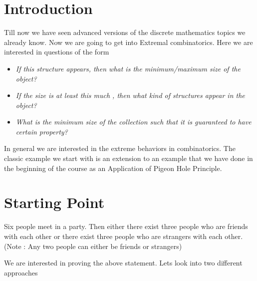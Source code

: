 \section{Introduction}
Till now we have seen advanced versions of the discrete mathematics topics we already know. Now we are going to get into Extremal combinatorics. Here we are interested in questions of the form 
\begin{itemize}
\item \textit{If this structure appears, then what is the minimum/maximum size of the object?}
\item \textit{If the size is at least this much , then what kind of structures appear in the object?}
\item \textit{What is the minimum size of the collection such that it is guaranteed to have certain property?}
\end{itemize}
In general we are interested in the extreme behaviors in combinatorics. The classic example we start with is an extension to an example that we have done in the beginning of the course as an Application of Pigeon Hole Principle.
\section{Starting Point} \label{R(3,3)}
\begin{theorem}
Six people meet in a party. Then either there exist three people who are friends with each other or there exist three people who are strangers with each other.(Note : Any two people can either be friends or strangers)
\end{theorem}
We are interested in proving the above statement. Lets look into two different approaches
